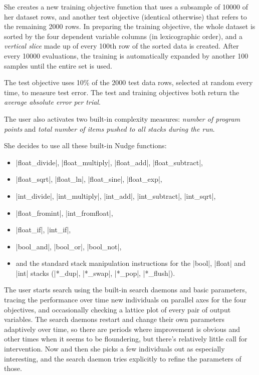 \documentclass[12pt]{article}
\begin{document}
She creates a new training objective function that uses a subsample of 10000 of her dataset rows, and another test objective (identical otherwise) that refers to the remaining 2000 rows. In preparing the training objective, the whole dataset is sorted by the four dependent variable columns (in lexicographic order), and a \emph{vertical slice} made up of every 100th row of the sorted data is created. After every 10000 evaluations, the training is automatically expanded by another 100 samples until the entire set is used.

The test objective uses 10\% of the 2000 test data rows, selected at random every time, to measure test error. The test and training objectives both return the \emph{average absolute error per trial}.

The user also activates two built-in complexity measures: \emph{number of program points} and \emph{total number of items pushed to all stacks during the run}.

She decides to use all these built-in Nudge functions: \begin{itemize} \item{|float_divide|, |float_multiply|, |float_add|, |float_subtract|,} \item{|float_sqrt|, |float_ln|, |float_sine|, |float_exp|,} \item{|int_divide|, |int_multiply|, |int_add|, |int_subtract|, |int_sqrt|,} \item{|float_fromint|, |int_fromfloat|,} \item{|float_if|, |int_if|,} \item{|bool_and|, |bool_or|, |bool_not|,} \item{and the standard stack manipulation instructions for the |bool|, |float| and |int| stacks (|*_dup|, |*_swap|, |*_pop|, |*_flush|).}\end{itemize}

The user starts search using the built-in search daemons and basic parameters, tracing the performance over time new individuals on parallel axes for the four objectives, and occasionally checking a lattice plot of every pair of output variables. The search daemons restart and change their own parameters adaptively over time, so there are periods where improvement is obvious and other times when it seems to be floundering, but there's relatively little call for intervention. Now and then she picks a few individuals out as especially interesting, and the search daemon tries explicitly to refine the parameters of those.
\end{document}
